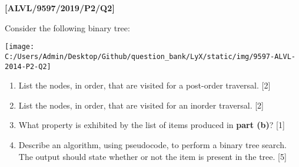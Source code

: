 \item \textbf{{[}ALVL/9597/2019/P2/Q2{]} }

Consider the following binary tree:
\begin{center}
\texttt{[image: C:/Users/Admin/Desktop/Github/question\_bank/LyX/static/img/9597-ALVL-2014-P2-Q2]}
\par\end{center}
\begin{enumerate}
\item List the nodes, in order, that are visited for a post-order traversal.
\hfill{}{[}2{]}
\item List the nodes, in order, that are visited for an inorder traversal.
\hfill{}{[}2{]}
\item What property is exhibited by the list of items produced in \textbf{part
(b)}? \hfill{}{[}1{]}
\item Describe an algorithm, using pseudocode, to perform a binary tree
search. The output should state whether or not the item is present
in the tree. \hfill{}{[}5{]}
\end{enumerate}